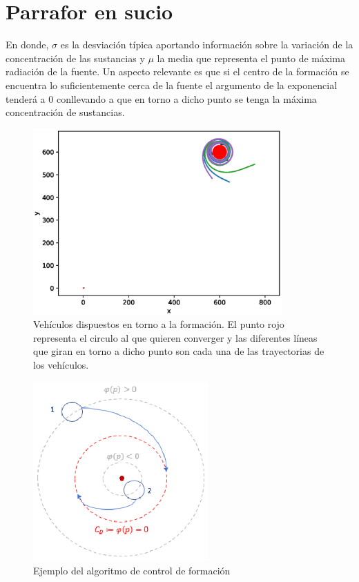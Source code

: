\newpage
\thispagestyle{empty}
\mbox{}

\chapter{Parrafor en sucio}
\label{ch:chapter6}


En donde, $\sigma$ es la desviación típica aportando información sobre la variación de la concentración de las sustancias y $\mu$ la media que representa el punto de máxima radiación de la fuente. Un aspecto relevante es que si el centro de la formación se encuentra lo suficientemente cerca de la fuente el argumento de la exponencial tenderá a 0 conllevando a que en torno a dicho punto se tenga la máxima concentración de sustancias.

\begin{figure}[htb]
\centering
\includegraphics[width=0.85\textwidth]{figures/Coordinacion/Objetivo_Final.eps}
\caption{Vehículos dispuestos en torno a la formación. El punto rojo representa el circulo al que quieren converger y las diferentes líneas que giran en torno a dicho punto son cada una de las trayectorias de los vehículos.} \label{Ejemplo_Coordinacion}
\end{figure}

\begin{figure}[H]
\centering
\includegraphics[width=0.60\textwidth]{figures/Pruea_Coordinacion.eps}
\caption{Ejemplo del algoritmo de control de formación} \label{Ejemplo_Coordinacion}
\end{figure}

